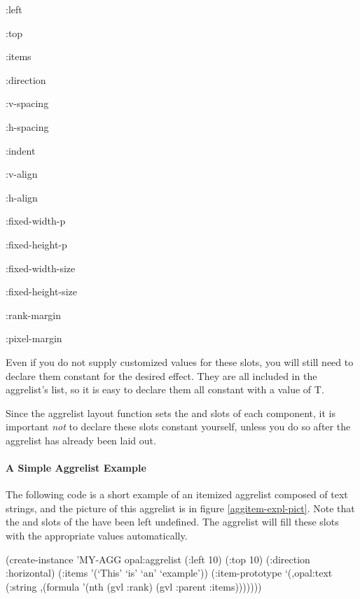 \vspace{1 line}
\begin{text}
:left

:top

:items

:direction

:v-spacing

:h-spacing

:indent

:v-align

:h-align

:fixed-width-p

:fixed-height-p

:fixed-width-size

:fixed-height-size

:rank-margin

:pixel-margin
\end{text}
\vspace{1 line}

Even if you do not supply customized values for these slots, you will still
need to declare them constant for the desired effect.  They are all included
in the aggrelist's  list, so it is easy to declare them
all constant with a  value of T.

Since the aggrelist layout function sets the  and  slots
of each component, it is important {\it not} to declare these slots constant
yourself, unless you do so after the aggrelist has already been laid out.


\paragraph{A Simple Aggrelist Example}
\label{aggitem-expl-ref}
The following code is a short example of an itemized aggrelist
composed of text strings, and the picture of this aggrelist is in
figure \ref{aggitem-expl-pict}.  Note that the  and
 slots of the  have been left undefined.
The aggrelist will fill these slots with the appropriate values
automatically.

\begin{programexample}
(create-instance 'MY-AGG opal:aggrelist
   (:left 10) (:top 10)
   (:direction :horizontal)
   (:items '(`This' `is' `an' `example'))
   (:item-prototype
    `(,opal:text
      (:string ,(formula '(nth (gvl :rank) (gvl :parent :items)))))))
\end{programexample}

